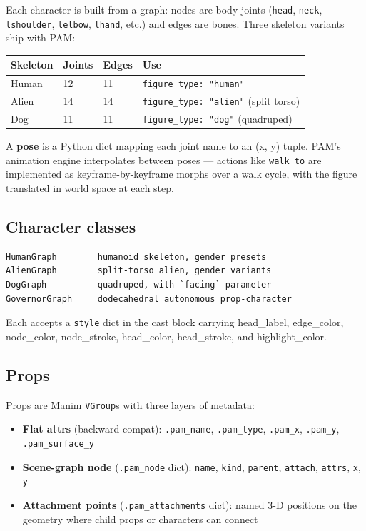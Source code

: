 \documentclass[
  11pt,
]{book}
\providecommand{\tightlist}{%
  \setlength{\itemsep}{0pt}\setlength{\parskip}{0pt}}
\begin{document}
Each character is built from a graph: nodes are body joints
(\texttt{head}, \texttt{neck}, \texttt{lshoulder}, \texttt{lelbow},
\texttt{lhand}, etc.) and edges are bones. Three skeleton variants ship
with PAM:

\begin{longtable}[]{@{}llll@{}}
\toprule\noalign{}
Skeleton & Joints & Edges & Use \\
\midrule\noalign{}
\endhead
\bottomrule\noalign{}
\endlastfoot
Human & 12 & 11 & \texttt{figure\_type:\ "human"} \\
Alien & 14 & 14 & \texttt{figure\_type:\ "alien"} (split torso) \\
Dog & 11 & 11 & \texttt{figure\_type:\ "dog"} (quadruped) \\
\end{longtable}

A \textbf{pose} is a Python dict mapping each joint name to an (x, y)
tuple. PAM's animation engine interpolates between poses --- actions
like \texttt{walk\_to} are implemented as keyframe-by-keyframe morphs
over a walk cycle, with the figure translated in world space at each
step.

\subsection{Character classes}\label{character-classes}

\begin{verbatim}
HumanGraph        humanoid skeleton, gender presets
AlienGraph        split-torso alien, gender variants
DogGraph          quadruped, with `facing` parameter
GovernorGraph     dodecahedral autonomous prop-character
\end{verbatim}

Each accepts a \texttt{style} dict in the cast block carrying
head\_label, edge\_color, node\_color, node\_stroke, head\_color,
head\_stroke, and highlight\_color.

\subsection{Props}\label{props}

Props are Manim \texttt{VGroup}s with three layers of metadata:

\begin{itemize}
\tightlist
\item
  \textbf{Flat attrs} (backward-compat): \texttt{.pam\_name},
  \texttt{.pam\_type}, \texttt{.pam\_x}, \texttt{.pam\_y},
  \texttt{.pam\_surface\_y}
\item
  \textbf{Scene-graph node} (\texttt{.pam\_node} dict): \texttt{name},
  \texttt{kind}, \texttt{parent}, \texttt{attach}, \texttt{attrs},
  \texttt{x}, \texttt{y}
\item
  \textbf{Attachment points} (\texttt{.pam\_attachments} dict): named
  3-D positions on the geometry where child props or characters can
  connect
\end{itemize}
\end{document}
